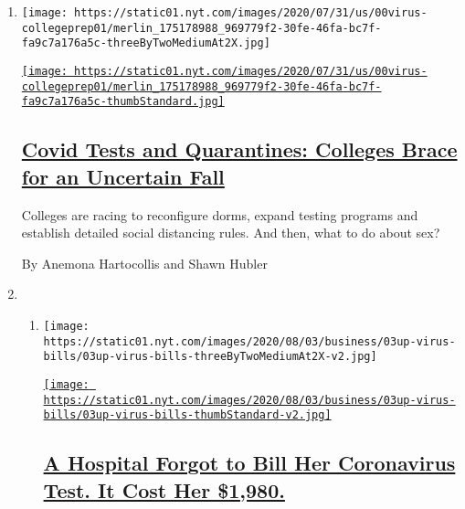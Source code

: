 \begin{enumerate}
\def\labelenumi{\arabic{enumi}.}
\item
  \texttt{[image: https://static01.nyt.com/images/2020/07/31/us/00virus-collegeprep01/merlin\_175178988\_969779f2-30fe-46fa-bc7f-fa9c7a176a5c-threeByTwoMediumAt2X.jpg]}

  \href{/2020/08/02/us/covid-college-reopening.html}{\texttt{[image: https://static01.nyt.com/images/2020/07/31/us/00virus-collegeprep01/merlin\_175178988\_969779f2-30fe-46fa-bc7f-fa9c7a176a5c-thumbStandard.jpg]}}

  \hypertarget{covid-tests-and-quarantines-colleges-brace-for-an-uncertain-fall}{%
  \subsection{\texorpdfstring{\href{/2020/08/02/us/covid-college-reopening.html}{Covid
  Tests and Quarantines: Colleges Brace for an Uncertain
  Fall}}{Covid Tests and Quarantines: Colleges Brace for an Uncertain Fall}}\label{covid-tests-and-quarantines-colleges-brace-for-an-uncertain-fall}}

  Colleges are racing to reconfigure dorms, expand testing programs and
  establish detailed social distancing rules. And then, what to do about
  sex?

  By Anemona Hartocollis and Shawn Hubler
\item
  \begin{enumerate}
  \def\labelenumii{\arabic{enumii}.}
  \item
    \texttt{[image: https://static01.nyt.com/images/2020/08/03/business/03up-virus-bills/03up-virus-bills-threeByTwoMediumAt2X-v2.jpg]}

    \href{/2020/08/03/upshot/nj-coronavirus-medical-bill.html}{\texttt{[image: https://static01.nyt.com/images/2020/08/03/business/03up-virus-bills/03up-virus-bills-thumbStandard-v2.jpg]}}

    \hypertarget{a-hospital-forgot-to-bill-her-coronavirus-test-it-cost-her-1980}{%
    \subsection{\texorpdfstring{\href{/2020/08/03/upshot/nj-coronavirus-medical-bill.html}{A
    Hospital Forgot to Bill Her Coronavirus Test. It Cost Her
    \$1,980.}}{A Hospital Forgot to Bill Her Coronavirus Test. It Cost Her \$1,980.}}\label{a-hospital-forgot-to-bill-her-coronavirus-test-it-cost-her-1980}}


\end{enumerate}
\end{enumerate}

